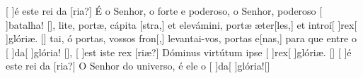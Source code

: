 {    {[ ]{é} este rei da [ria?] É o Senhor, o forte e poderoso, o Senhor, poderoso [ ]{ba}{ta}lha! [\LinkPT]},
  {lite, portæ, cápita [stra,] et elevámini, portæ æter[les,] et introí[ ]{rex}[ ]{gló}riæ. [\LinkLA]}%
    {tai, ó portas, vossos fron[,] levantai-vos, portas e[nas,] para que entre o [ ]{da}[ ]{gló}ria! [\LinkPT]},
  {[ ]{est} iste rex [riæ?] Dóminus virtútum ipse [ ]{rex}[ ]{gló}riæ. [\LinkLA]}%
    {[ ]{é} este rei da [ria?] O Senhor do universo, é ele o [ ]{da}[ ]{gló}ria![\LinkPT]}
}